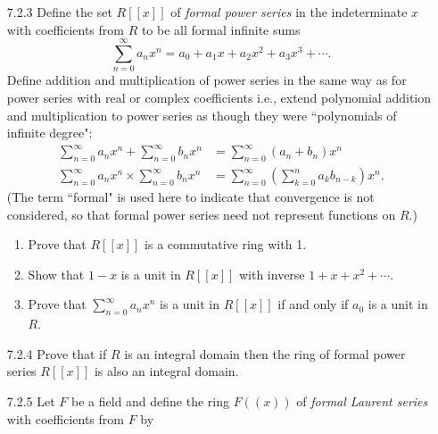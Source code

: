 \begin{enumerate}
      
   \item[7.2.3]   Define the set $R[[x]]$ of \textit{formal power series} in the
                  indeterminate $x$ with coefficients from $R$ to be all formal
                  infinite sums
                  $$\sum_{n=0}^\infty a_nx^n = a_0 + a_1x +
                       a_2x^2 + a_3x^3 + \cdots.$$
                  Define addition and multiplication of power series in the same
                  way as for power series with real or complex coefficients
                  i.e., extend polynomial addition and multiplication to power
                  series as though they were ``polynomials of infinite degree":
                  \begin{align*}
                     \sum_{n=0}^\infty a_nx^n + \sum_{n=0}^\infty b_nx^n &=
                        \sum_{n=0}^\infty (a_n + b_n)x^n \\
                     \sum_{n=0}^\infty a_nx^n \times \sum_{n=0}^\infty b_nx^n &=
                        \sum_{n=0}^\infty\left(\sum_{k=0}^na_kb_{n-k}\right)x^n. 
                  \end{align*}
                  (The term ``formal" is used here to indicate that convergence
                  is not considered, so that formal power series need not
                  represent functions on $R$.)
                  \begin{enumerate}
                     \item Prove that $R[[x]]$ is a commutative ring with 1.
                     \item Show that $1- x$ is a unit in $R[[x]]$ with inverse
                           $1 + x + x^2 + \cdots$.
                     \item Prove that $\sum_{n=0}^\infty a_nx^n$ is a unit in
                           $R[[x]]$ if and only if $a_0$ is a unit in $R$.
                  \end{enumerate}
   \item[7.2.4]   Prove that if $R$ is an integral domain then the ring of
                  formal power series $R[[x]]$ is also an integral domain.
   \item[7.2.5]   Let $F$ be a field and define the ring $F((x))$ of
                  \textit{formal Laurent series} with coefficients from $F$ by

\end{enumerate}
